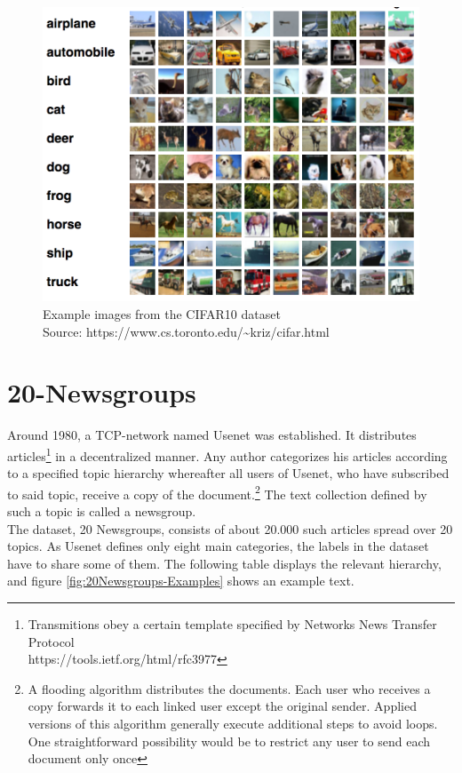 \begin{figure}
	\centering
	\includegraphics[width=450px]{gfx/6-Datasets/CIFAR10_examples.png}
	\caption{
		Example images from the CIFAR10 dataset\\
		Source: https://www.cs.toronto.edu/\textasciitilde kriz/cifar.html \cite{CIFAR-Website}
	}
	\label{fig:CIFAR10-Examples}
\end{figure}
\newpage

\section{20-Newsgroups}
Around 1980, a TCP-network named Usenet was established. It distributes articles\footnote{
	Transmitions obey a certain template specified by  Networks News Transfer Protocol\\
	https://tools.ietf.org/html/rfc3977
}
in a decentralized manner. Any author categorizes his articles according to a specified topic hierarchy whereafter all users of Usenet, who have subscribed to said topic, receive a copy of the document.\footnote{
	A flooding algorithm distributes the documents. Each user who receives a copy forwards it to each linked user except the original sender. Applied versions of this algorithm generally execute additional steps to avoid loops. One straightforward possibility would be to restrict any user to send each document only once
}
The text collection defined by such a topic is called a newsgroup. \cite{Usenet}\\
The dataset, 20 Newsgroups, consists of about 20.000 such articles spread over 20 topics. As Usenet defines only eight main categories, the labels in the dataset have to share some of them. The following table displays the relevant hierarchy, and figure \ref{fig:20Newsgroups-Examples} shows an example text. \cite{20-Newsgroups}

